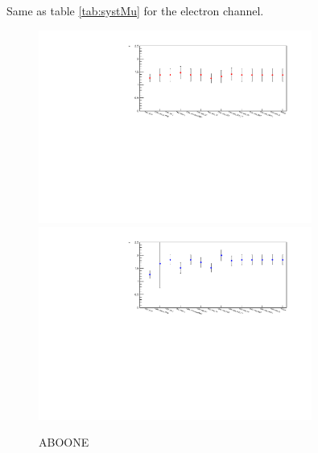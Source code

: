 \begin{table}
\caption[Systematic uncertainties in the electron channel.]{Same as table \ref{tab:systMu} for the electron channel.}
\label{tab:systEle}

\end{table}

\begin{figure}[htbp]
	\centering
		\includegraphics[width=0.8\textwidth]{Figures/Results/Muon/systPlots/MuMTstability_abo_5FS.pdf}
		\includegraphics[width=0.8\textwidth]{Figures/Results/Muon/systPlots/MuMTstability_one_5FS.pdf}		
	\caption{ABOONE}
	\label{fig:systStability_mu}
\end{figure}
